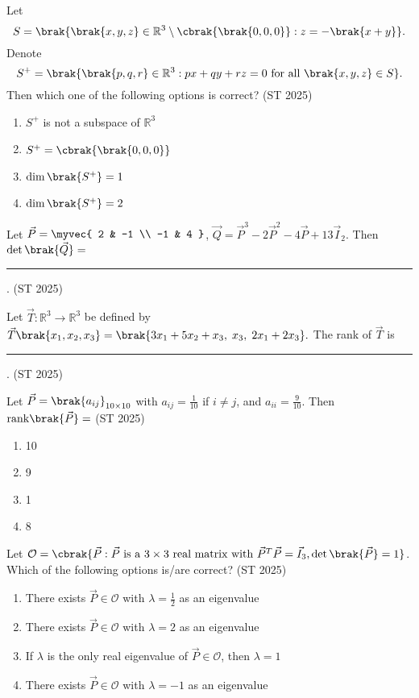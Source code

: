 \item Let $$S = \brak{\brak{x, y, z} \in \mathbb{R}^3 \setminus \cbrak{\brak{0,0,0}} : z = -\brak{x + y} }.$$ Denote
$$
S^+ =\brak{\brak{p,q,r} \in \mathbb{R}^3 : px + qy + rz = 0 \text{ for all } \brak{x, y, z} \in S}.
$$
Then which one of the following options is correct?
\hfill{(ST 2025)}
\begin{multicols}{2}
\begin{enumerate}
\item $S^+$ is not a subspace of $\mathbb{R}^3$
\item $S^+ = \cbrak{\brak{0,0,0}}$
\item $\dim\brak{S^+} = 1$
\item $\dim\brak{S^+} = 2$
\end{enumerate}
\end{multicols}
\item Let 
$\vec{P}=\myvec{ 2 & -1 \\ -1 & 4 }$, 
$\vec{Q}=\vec{P}^3 - 2\vec{P}^2 -4\vec{P} + 13\vec{I}_2$.  
Then $\det\brak{\vec{Q}}=$ \rule{1cm}{0.01pt}.
\hfill{(ST 2025)}
\item Let $\vec{T}:\mathbb{R}^3\to\mathbb{R}^3$ be defined by
$
\vec{T}\brak{x_1,x_2,x_3} = \brak{3x_1+5x_2+x_3,\; x_3,\; 2x_1+2x_3}.
$
The rank of $\vec{T}$ is \rule{1cm}{0.01pt}.
\hfill{(ST 2025)}
\item Let $\vec{P}=\brak{a_{ij}}_{10\times 10}$ with 
$a_{ij}=\tfrac{1}{10}$ if $i\neq j$, and $a_{ii}=\tfrac{9}{10}$. Then $\mathrm{rank}\brak{\vec{P}}=$
\hfill{(ST 2025)}
\begin{multicols}{4}
\begin{enumerate}
\item 10 \item 9 \item 1 \item 8
\end{enumerate}
\end{multicols}
\item Let $\mathcal{O} = \cbrak{\vec{P}: \vec{P} \text{ is a } 3\times 3 \text{ real matrix with } \vec{P}^T\vec{P}=\vec{I}_3, \det\brak{\vec{P}}=1}$.  
Which of the following options is/are correct?
\hfill{(ST 2025)}
\begin{enumerate}
\item There exists $\vec{P} \in \mathcal{O}$ with $\lambda=\tfrac{1}{2}$ as an eigenvalue
\item There exists $\vec{P} \in \mathcal{O}$ with $\lambda=2$ as an eigenvalue
\item If $\lambda$ is the only real eigenvalue of $\vec{P} \in \mathcal{O}$, then $\lambda=1$
\item There exists $\vec{P} \in \mathcal{O}$ with $\lambda=-1$ as an eigenvalue
\end{enumerate}
